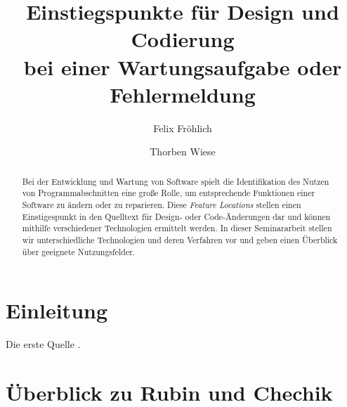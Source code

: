 \documentclass[runningheads,a4paper]{llncs}
\begin{document}
\title{Einstiegspunkte für Design und Codierung \\bei einer Wartungsaufgabe oder Fehlermeldung}


\author{Felix Fröhlich \and Thorben Wiese}



\maketitle

\begin{abstract}
Bei der Entwicklung und Wartung von Software spielt die Identifikation des Nutzen von Programmabschnitten eine große Rolle, um entsprechende Funktionen einer Software zu ändern oder zu reparieren. Diese \textit{Feature Locations} stellen einen Einstigespunkt in den Quelltext für Design- oder Code-Änderungen dar und können mithilfe verschiedener Technologien ermittelt werden. In dieser Seminararbeit stellen wir unterschiedliche Technologien und deren Verfahren vor und geben einen Überblick über geeignete Nutzungsfelder.
\end{abstract}

\section{Einleitung}

Die erste Quelle \cite{survey}.

\section{Überblick  zu Rubin und Chechik}
\end{document}
